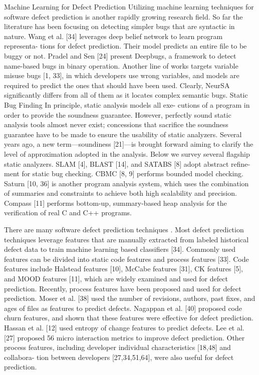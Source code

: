 \documentclass{article}
\begin{document}
Machine Learning for Defect Prediction Utilizing machine learning techniques for software defect prediction is another rapidly growing research field. So far the literature has been focusing on detecting simpler bugs that are syntactic in nature. Wang et al. [34] leverages deep belief network to learn program representa- tions for defect prediction. Their model predicts an entire file to be buggy or not. Pradel and Sen [24] present Deepbugs, a framework to detect name-based bugs in binary operation. Another line of works targets variable misuse bugs [1, 33], in which developers use wrong variables, and models are required to predict the ones that should have been used. Clearly, NeurSA significantly differs from all of them as it locates complex semantic bugs.
Static Bug Finding In principle, static analysis models all exe- cutions of a program in order to provide the soundness guarantee. However, perfectly sound static analysis tools almost never exist; concessions that sacrifice the soundness guarantee have to be made to ensure the usability of static analyzers. Several years ago, a new term—soundiness [21]—is brought forward aiming to clarify the level of approximation adopted in the analysis. Below we survey several flagship static analyzers.
SLAM [4], BLAST [14], and SATABS [8] adopt abstract refine- ment for static bug checking. CBMC [8, 9] performs bounded model checking. Saturn [10, 36] is another program analysis system, which uses the combination of summaries and constraints to achieve both high scalability and precision. Compass [11] performs bottom-up, summary-based heap analysis for the verification of real C and C++ programs.

There are many software defect prediction techniques . Most defect prediction techniques leverage features that are manually extracted from labeled historical defect data to train machine learning based classifiers [34]. Commonly used features can be divided into static code features and process features [33]. Code features include Halstead features [10], McCabe features [31], CK features [5], and MOOD features [11], which are widely examined and used for defect prediction. Recently, process features have been proposed and used for defect prediction. Moser et al. [38] used the number of revisions, authors, past fixes, and ages of files as features to predict defects. Nagappan et al. [40] proposed code churn features, and shown that these features were effective for defect prediction. Hassan et al. [12] used entropy of change features to predict defects. Lee et al. [27] proposed 56 micro interaction metrics to improve defect prediction. Other process features, including developer individual characteristics [18,48] and collabora- tion between developers [27,34,51,64], were also useful for defect prediction.
\end{document}
